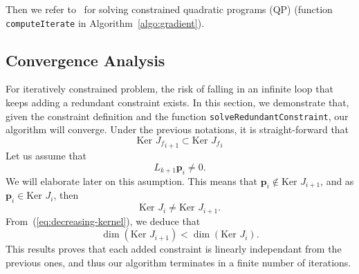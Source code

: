 \documentclass{tADR2e}
\newcommand\p{\mathbf{p}}
\newcommand\pii{\mathbf{p_{i,i+1}}}
\newcommand\xx{\mathbf{x}} %
\newcommand\Jf{{J_f}}
\newcommand\kernel{\mbox{Ker }}
\begin{document}
\vspace{0.4cm}

Then we refer to~\cite{nocedal2006numerical} for solving constrained quadratic 
programs (QP) (function \texttt{computeIterate} in 
Algorithm~\ref{algo:gradient}).



\subsection*{Convergence Analysis}
For iteratively constrained problem, the risk of falling in an infinite loop 
that keeps adding a redundant constraint exists.
In this section, we demonstrate that, given the constraint definition and the 
function \texttt{solveRedundantConstraint}, our 
algorithm will converge.
Under the previous notations, it is straight-forward that
\begin{equation}\label{eq:decreasing-kernel}
\kernel \Jf_{i+1} \subset \kernel \Jf_{i}
\end{equation}
Let us assume that
\begin{equation}\label{eq:asumption-1}
L_{k+1}\p_i \not= 0.
\end{equation}
We will elaborate later on this asumption. This means that $\p_{i}\notin\kernel J_{i+1}$, and as $\p_{i}\in\kernel J_{i}$, then
$$
\kernel J_i \not= \kernel J_{i+1}.
$$
From~(\ref{eq:decreasing-kernel}), we deduce that
$$
\dim (\kernel J_{i+1}) < \dim (\kernel J_i).
$$
This results proves that each added constraint is linearly independant from the 
previous ones, and thus our algorithm terminates in a finite number of iterations.
\end{document}
